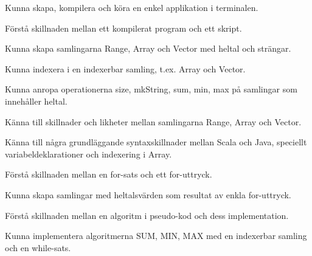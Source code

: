 
\item Kunna skapa, kompilera och köra en enkel applikation i terminalen.
\item Förstå skillnaden mellan ett kompilerat program och ett skript.
\item Kunna skapa samlingarna Range, Array och Vector med heltal och strängar.
\item Kunna indexera i en indexerbar samling, t.ex. Array och Vector.
\item Kunna anropa operationerna size, mkString, sum, min, max på samlingar som innehåller heltal.
\item Känna till skillnader och likheter mellan samlingarna Range, Array och Vector.
\item Känna till några grundläggande syntaxskillnader mellan Scala och Java, speciellt variabeldeklarationer och indexering i Array.
\item Förstå skillnaden mellan en for-sats och ett for-uttryck.
\item Kunna skapa samlingar med heltalsvärden som resultat av enkla for-uttryck.
\item Förstå skillnaden mellan en algoritm i pseudo-kod och dess implementation.
\item Kunna implementera algoritmerna SUM, MIN, MAX med en indexerbar samling och en while-sats.
